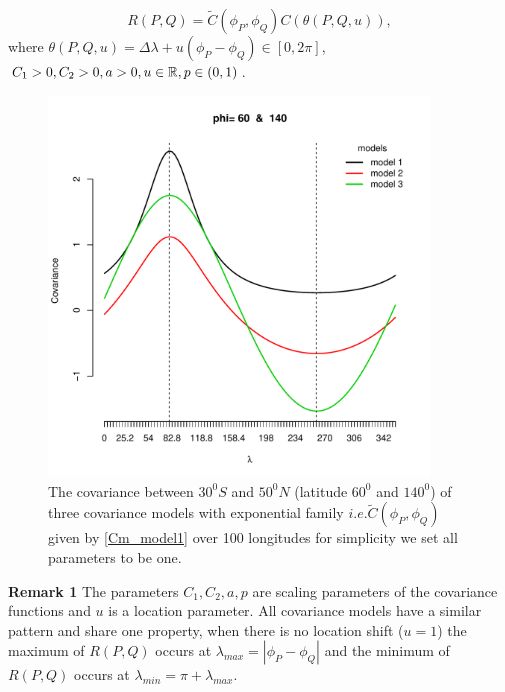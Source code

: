 	\[
		R(P,Q) = \tilde{C}(\phi_P, \phi_Q) C(\theta(P,Q,u)),
	\]
	where $\theta(P,Q,u)=\Delta\lambda+u(\phi_P-\phi_Q) \in [0,2\pi ] $, $C_1 > 0, C_2 > 0, a>0, u\in \mathbb{R}, p\in(0,1)$. 
		
	\begin{figure}[H]
		\centering
		\includegraphics[width=0.9\textwidth]{graphs/all_covariance_models}
		\caption[The covariance between $30^0S$ and $50^0N$ (latitude $60^0$ and $140^0$) of three covariance models] {The covariance between $30^0S$ and $50^0N$ (latitude $60^0$ and $140^0$) of three covariance models with exponential family $ i.e. \tilde{C}(\phi_P, \phi_Q)$ given by \ref{Cm_model1} over 100 longitudes  for simplicity we set all parameters to be one.}
	\end{figure}
	
	{\bf Remark 1} The parameters $C_1, C_2, a, p$ are scaling parameters of the covariance functions and $u$ is a location parameter. All covariance models have a similar pattern and share one property, when there is no location shift ($u = 1$) the maximum of $R(P,Q)$ occurs at $\lambda_{max} = |\phi_P -\phi_Q|$ and the minimum of $R(P,Q)$ occurs at $\lambda_{min} = \pi + \lambda_{max}$. 
		
